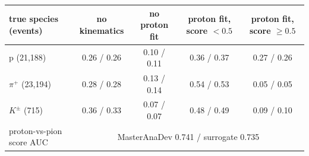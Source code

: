 \begin{tabular}{lcccc}
\toprule
true species (events) & no kinematics & no proton fit & proton fit, score $<0.5$ & proton fit, score $\geq 0.5$ \\
\midrule
p (21,188) & 0.26 / 0.26 & 0.10 / 0.11 & 0.36 / 0.37 & 0.27 / 0.26 \\
$\pi^+$ (23,194) & 0.28 / 0.28 & 0.13 / 0.14 & 0.54 / 0.53 & 0.05 / 0.05 \\
$K^\pm$ (715) & 0.36 / 0.33 & 0.07 / 0.07 & 0.48 / 0.49 & 0.09 / 0.10 \\
\midrule
proton-vs-pion score AUC & \multicolumn{4}{c}{MasterAnaDev 0.741 / surrogate 0.735} \\
\bottomrule
\end{tabular}
